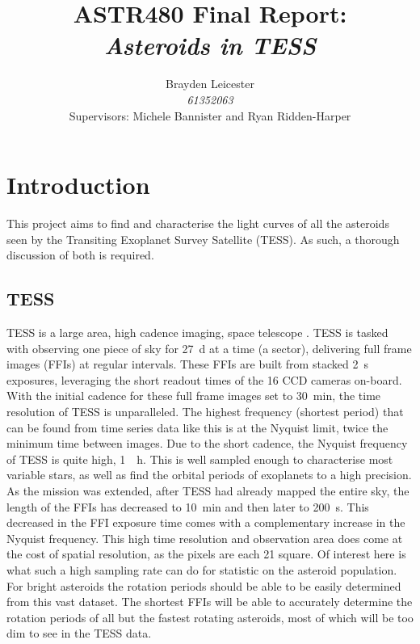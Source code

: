 \documentclass[12pt]{article}
\title{ASTR480 Final Report:\\
\textit{Asteroids in TESS}
}
\author{Brayden Leicester \\ 
\textit{61352063} \\
[1ex]\small{Supervisors: Michele Bannister and Ryan Ridden-Harper}
}
\begin{document}
\maketitle




\newpage
{}

\section{Introduction}\label{Sec:Intro}

This project aims to find and characterise the light curves of all the asteroids seen by the Transiting Exoplanet Survey Satellite (TESS).
As such, a thorough discussion of both is required.


\subsection{TESS}\label{SubSec:TESS}

TESS is a large area, high cadence imaging, space telescope  \citep{Ricker2014}.
TESS is tasked with observing one piece of sky for \qty{27}{\day} at a time (a sector), delivering  full frame images (FFIs) at regular intervals.
These FFIs are built from stacked \qty{2}{\second} exposures, leveraging the short readout times of the 16 CCD cameras on-board.
With the initial cadence for these full frame images set to \qty{30}{\minute}, the time resolution of TESS is unparalleled.
The highest frequency (shortest period) that can be found from time series data like this is at the Nyquist limit, twice the minimum time between images.  
Due to the short cadence, the Nyquist frequency of TESS is quite high, \qty{1}{\per\hour}. 
This is well sampled enough to characterise most variable stars, as well as find the orbital periods of exoplanets to a high precision.
As the mission was extended, after TESS had already mapped the entire sky, the length of the FFIs has decreased to \qty{10}{\minute} and then later to \qty{200}{\second}.
This decreased in the FFI exposure time comes with a complementary increase in the Nyquist frequency.
This high time resolution and observation area does come at the cost of spatial resolution, as the pixels are each \qty{21}{\arcsec} square.
Of interest here is what such a high sampling rate can do for statistic on the asteroid population.
For bright asteroids the rotation periods should be able to be easily determined from this vast dataset.
The shortest FFIs will be able to accurately determine the rotation periods of all but the fastest rotating asteroids, most of which will be too dim to see in the TESS data.
\end{document}
